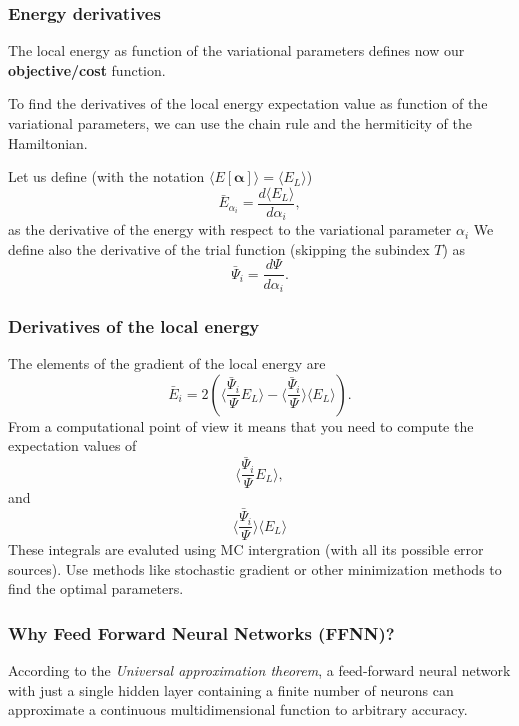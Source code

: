 \documentclass{beamer}
\begin{document}
\begin{frame}
\frametitle{Energy derivatives}

\begin{block}{}
The local energy as function of the variational parameters defines now our \textbf{objective/cost} function.

To find the derivatives of the local energy expectation value as function of the variational parameters, we can use the chain rule and the hermiticity of the Hamiltonian.  

Let us define (with the notation $\langle E[\bm{\alpha}]\rangle =\langle  E_L\rangle$)
\[
\bar{E}_{\alpha_i}=\frac{d\langle  E_L\rangle}{d\alpha_i},
\]
as the derivative of the energy with respect to the variational parameter $\alpha_i$
We define also the derivative of the trial function (skipping the subindex $T$) as 
\[
\bar{\Psi}_{i}=\frac{d\Psi}{d\alpha_i}.
\]
\end{block}
\end{frame}

\begin{frame}
\frametitle{Derivatives of the local energy}

\begin{block}{}
The elements of the gradient of the local energy are 
\[
\bar{E}_{i}= 2\left( \langle \frac{\bar{\Psi}_{i}}{\Psi}E_L\rangle -\langle \frac{\bar{\Psi}_{i}}{\Psi}\rangle\langle E_L \rangle\right).
\]
From a computational point of view it means that you need to compute the expectation values of 
\[
\langle \frac{\bar{\Psi}_{i}}{\Psi}E_L\rangle,
\]
and
\[
\langle \frac{\bar{\Psi}_{i}}{\Psi}\rangle\langle E_L\rangle
\]
These integrals are evaluted using MC intergration (with all its possible error sources). Use methods like stochastic gradient or other minimization methods to find the optimal parameters.
\end{block}
\end{frame}

\begin{frame}
\frametitle{Why Feed Forward Neural Networks (FFNN)?}

\begin{block}{}
According to the \emph{Universal approximation theorem}, a feed-forward
neural network with just a single hidden layer containing a finite
number of neurons can approximate a continuous multidimensional
function to arbitrary accuracy.
\end{block}
\end{frame}
\end{document}
